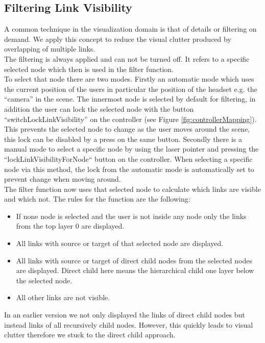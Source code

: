 \subsection{Filtering Link Visibility}
\label{chap:ps-filterLinks}
A common technique in the visualization domain is that of details or filtering on demand. We apply this concept to reduce the visual clutter produced by overlapping of multiple links.\\
The filtering is always applied and can not be turned off. It refers to a specific selected node which then is used in the filter function.\\
To select that node there are two modes. Firstly an automatic mode which uses the current position of the users in particular the position of the headset e.g. the “camera” in the scene. 
The innermost node is selected by default for filtering, in addition the user can lock the selected node with the button “switchLockLinkVisibility” on the controller (see Figure \ref{fig:controllerMapping}). This prevents the selected node to change as the user moves around the scene, this lock can be disabled by a press on the same button.
Secondly there is a manual mode to select a specific node by using the laser pointer and pressing the “lockLinkVisibilityForNode“ button on the controller. When selecting a specific node via this method, the lock from the automatic mode is automatically set to prevent change when moving around.\\
The filter function now uses that selected node to calculate which links are visible and which not. The rules for the function are the following:
\begin{itemize}
    \item If none node is selected and the user is not inside any node only the links from the top layer 0 are displayed.
    \item All links with source or target of that selected node are displayed. 
    \item All links with source or target of direct child nodes from the selected nodes are displayed. Direct child here means the hierarchical child one layer below the selected node. 
    \item All other links are not visible.
\end{itemize}

In an earlier version we not only displayed the links of direct child nodes but instead links of all recursively child nodes. However, this quickly leads to visual clutter therefore we stuck to the direct child approach.

